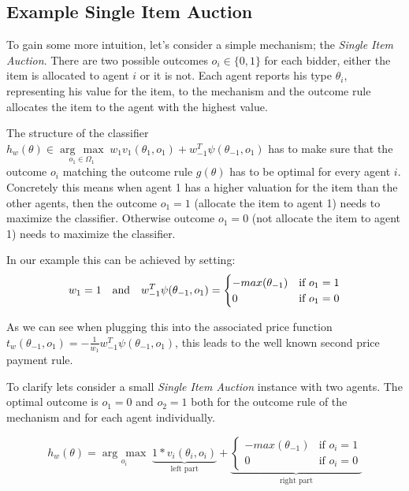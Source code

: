 \documentclass[]{article}
\newcommand{\argmax}[1]{\underset{#1}{\operatorname{arg}\,\operatorname{max}}\;}
\begin{document}
\subsection{Example Single Item Auction}
To gain some more intuition, let's consider a simple mechanism; the \emph{Single Item Auction}. There are two possible outcomes  $o_{i}\in\{0,1\}$ for each bidder, either the item is allocated to agent $i$ or it is not. Each agent reports his type  $\theta_{i}$, representing his value for the item, to the mechanism and the outcome rule allocates the item to the agent with the highest value.


\noindent The structure of the classifier $h_{w}(\theta) \in \argmax{o_{1} \in \Omega_{1}} w_{1}v_{1}(\theta_{1}, o_{1})+ w_{-1}^{T}\psi(\theta_{-1}, o_{1})$ has to make sure that the outcome $o_{i}$ matching the outcome rule $g(\theta)$ has to be optimal for every agent $i$. Concretely this means when agent 1 has a higher valuation for the item than the other agents, then the outcome $o_{1} = 1$ (allocate the item to agent 1) needs to maximize the classifier. Otherwise outcome $o_{1}=0$ (not allocate the item to agent 1) needs to maximize the classifier.

\noindent In our example this can be achieved by setting: 
\begin{equation*}
w_{1} = 1 \text{\quad and\quad} w_{-1}^T \psi(\theta_{-1},o_{1})= 
\begin{cases}
- max(\theta_{-1})& \text{if } o_{1} = 1\\
0              & \text{if } o_{1} = 0
\end{cases}
\end{equation*}

\noindent As we can see when plugging this into the associated price function  $t_{w}(\theta_{-1}, o_{1}) = - \frac{1}{w_{1}} w_{-1}^T \psi(\theta_{-1},o_{1})$, this leads to the well known second price payment rule.

\newpage
\noindent To clarify lets consider a small \emph{Single Item Auction} instance with two agents. The optimal outcome is $o_{1}=0$ and $o_{2}=1$ both for the  outcome rule of the mechanism and for each agent individually.

\begin{equation*}
h_{w}(\theta) = \argmax{o_{i}} \underbrace{1 * v_{i}(\theta_{i},o_{i})}_{\text{left part}} +
\underbrace{\begin{cases}
- max(\theta_{-1})& \text{if } o_{i} = 1\\
0              & \text{if } o_{i} = 0
\end{cases}}_{\text{right part}}
\end{equation*}
\end{document}
